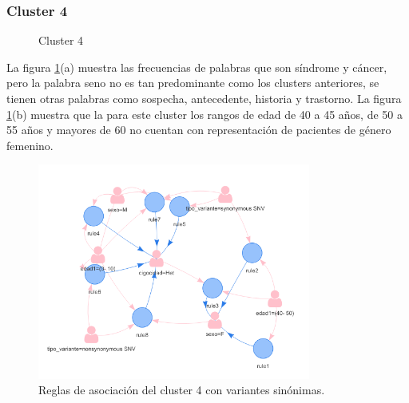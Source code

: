 \subsubsection*{Cluster 4}
\begin{figure}[H]
	\centering
	\caption{Cluster 4} \label{fig:c4}
\end{figure}

La figura \ref{fig:c4}(a) muestra las frecuencias de palabras que son síndrome y cáncer, pero la palabra seno no es tan predominante como los clusters anteriores, se tienen otras palabras como sospecha, antecedente, historia y trastorno. La figura \ref{fig:c4}(b) muestra que la para este cluster los rangos de edad de 40 a 45 años, de 50 a 55 años y mayores de 60 no cuentan con representación de pacientes de género femenino.

\begin{figure}[H]
	\centering
	\includegraphics[width=0.8\textwidth]{Kap4/reglas4_1}
	\caption{Reglas de asociación del cluster 4 con variantes sinónimas.} \label{fig:r4}
\end{figure}


